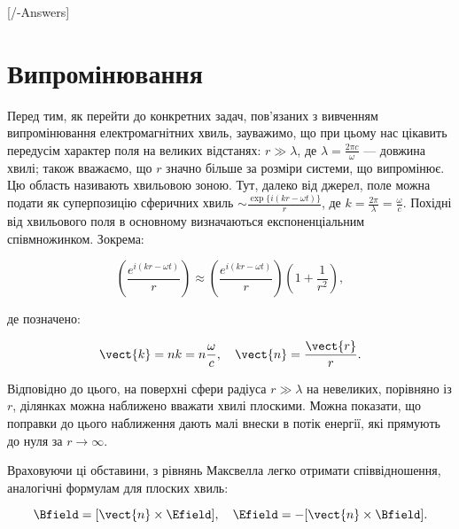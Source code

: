 
[\currfilebase/\currfilebase-Answers]
\chapter{Випромінювання}\label{\currfilebase}


Перед тим, як перейти до конкретних задач, пов’язаних з вивченням випромінювання електромагнітних хвиль, зауважимо, що при цьому нас цікавить передусім
характер поля на великих відстанях: \( r \gg \lambda \), де \( \lambda = \frac{2\pi c}{\omega} \) --- довжина хвилі; також вважаємо, що \( r \) значно
більше за розміри системи, що випромінює. Цю область називають хвильовою зоною. Тут, далеко від джерел, поле можна подати як суперпозицію сферичних
хвиль \( \sim \frac{\exp\{i(kr - \omega t)\}}{r} \), де \( k = \frac{2\pi}{\lambda} = \frac{\omega}{c} \). Похідні від хвильового поля в основному
визначаються експоненціальним співмножинком. Зокрема:

\begin{equation}
	\left( \frac{e^{i(kr - \omega t)}}{r} \right) \approx \left( \frac{e^{i(kr - \omega t)}}{r} \right) \left( 1 + \frac{1}{r^2} \right),
	\label{eq:wave_field}
\end{equation}

де позначено:

\begin{equation}
	\vect{k} = nk = n\frac{\omega}{c}, \quad \vect{n} = \frac{\vect{r}}{r}.
	\label{eq:wave_vector}
\end{equation}

Відповідно до цього, на поверхні сфери радіуса \( r \gg \lambda \) на невеликих, порівняно із \( r \), ділянках можна наближено вважати хвилі плоскими.
Можна показати, що поправки до цього наближення дають малі внески в потік енергії, які прямують до нуля за \( r \to \infty \).

Враховуючи ці обставини, з рівнянь Максвелла легко отримати співвідношення, аналогічні формулам для плоских хвиль:

\begin{equation}
	\Bfield = [\vect{n} \times \Efield], \quad \Efield = -[\vect{n} \times \Bfield].
	\label{eq:maxwell_relations}
\end{equation}

